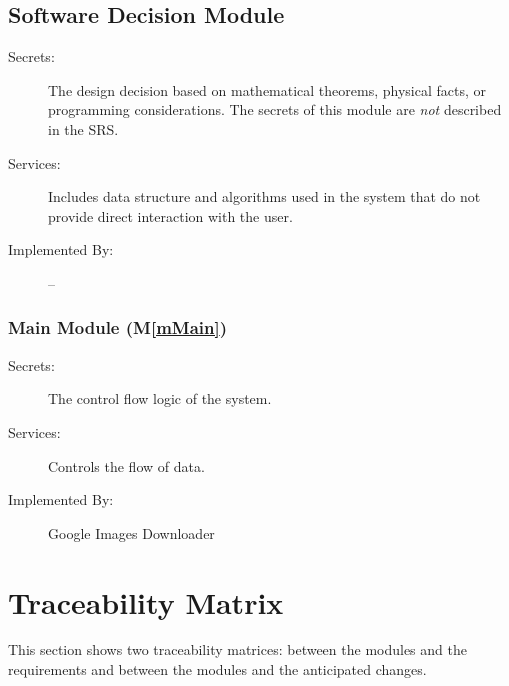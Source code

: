 \documentclass[12pt, titlepage]{article}
\newcommand{\mref}[1]{M\ref{#1}}
\begin{document}
\subsection{Software Decision Module}

\begin{description}
\item[Secrets:] The design decision based on mathematical theorems, physical
  facts, or programming considerations. The secrets of this module are
  \emph{not} described in the SRS.
\item[Services:] Includes data structure and algorithms used in the system that
  do not provide direct interaction with the user. 
\item[Implemented By:] --
\end{description}

\subsubsection{Main Module (\mref{mMain})}

\begin{description}
\item[Secrets:]The control flow logic of the system.
\item[Services:]Controls the flow of data.
\item[Implemented By:]Google Images Downloader
\end{description}

\newpage

\section{Traceability Matrix} \label{SecTM}

This section shows two traceability matrices: between the modules and the
requirements and between the modules and the anticipated changes.
\end{document}

